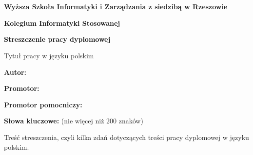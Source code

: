 \chapter*{}
\label{cha:streszczenie-pl}

\makeatletter

\noindent \textbf{Wyższa Szkoła Informatyki i Zarządzania z siedzibą w Rzeszowie}

\noindent \textbf{Kolegium Informatyki Stosowanej}


\begin{center}
    \textbf{Streszczenie pracy dyplomowej}

    Tytuł pracy w języku polskim 
\end{center}


\noindent \textbf{Autor:}

\noindent \textbf{Promotor:}

\noindent \textbf{Promotor pomocniczy:}

\noindent \textbf{Słowa kluczowe:} (nie więcej niż 200 znaków)

Treść streszczenia, czyli kilka zdań dotyczących treści pracy dyplomowej w języku polskim.

